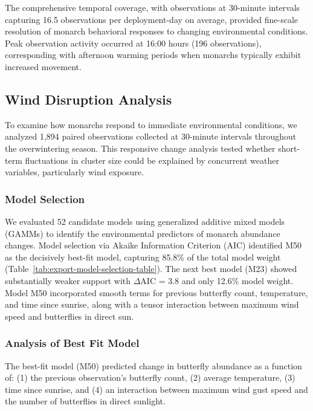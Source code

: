 The comprehensive temporal coverage, with observations at 30-minute intervals capturing 16.5 observations per deployment-day on average, provided fine-scale resolution of monarch behavioral responses to changing environmental conditions. Peak observation activity occurred at 16:00 hours (196 observations), corresponding with afternoon warming periods when monarchs typically exhibit increased movement.

\subsection{Wind Disruption Analysis}

To examine how monarchs respond to immediate environmental conditions, we analyzed 1,894 paired observations collected at 30-minute intervals throughout the overwintering season. This responsive change analysis tested whether short-term fluctuations in cluster size could be explained by concurrent weather variables, particularly wind exposure.

\subsubsection{Model Selection}

We evaluated 52 candidate models using generalized additive mixed models (GAMMs) to identify the environmental predictors of monarch abundance changes. Model selection via Akaike Information Criterion (AIC) identified M50 as the decisively best-fit model, capturing 85.8\% of the total model weight (Table~\ref{tab:export-model-selection-table}). The next best model (M23) showed substantially weaker support with $\Delta$AIC = 3.8 and only 12.6\% model weight. Model M50 incorporated smooth terms for previous butterfly count, temperature, and time since sunrise, along with a tensor interaction between maximum wind speed and butterflies in direct sun.

 

\subsubsection{Analysis of Best Fit Model}

The best-fit model (M50) predicted change in butterfly abundance as a function of: (1) the previous observation's butterfly count, (2) average temperature, (3) time since sunrise, and (4) an interaction between maximum wind gust speed and the number of butterflies in direct sunlight.

